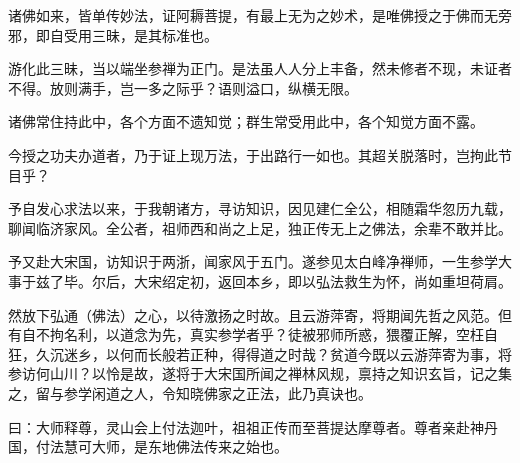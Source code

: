 




诸佛如来，皆单传妙法，证阿耨菩提，有最上无为之妙术，是唯佛授之于佛而无旁邪，即自受用三昧，是其标准也。

游化此三昧，当以端坐参禅为正门。是法虽人人分上丰备，然未修者不现，未证者不得。放则满手，岂一多之际乎？语则溢口，纵横无限。

诸佛常住持此中，各个方面不遗知觉；群生常受用此中，各个知觉方面不露。

今授之功夫办道者，乃于证上现万法，于出路行一如也。其超关脱落时，岂拘此节目乎？

予自发心求法以来，于我朝诸方，寻访知识，因见建仁全公，相随霜华忽历九载，聊闻临济家风。全公者，祖师西和尚之上足，独正传无上之佛法，余辈不敢并比。

予又赴大宋国，访知识于两浙，闻家风于五门。遂参见太白峰净禅师，一生参学大事于兹了毕。尔后，大宋绍定初，返回本乡，即以弘法救生为怀，尚如重坦荷肩。

然放下弘通（佛法）之心，以待激扬之时故。且云游萍寄，将期闻先哲之风范。但有自不拘名利，以道念为先，真实参学者乎？徒被邪师所惑，猥覆正解，空枉自狂，久沉迷乡，以何而长般若正种，得得道之时哉？贫道今既以云游萍寄为事，将参访何山川？以怜是故，遂将于大宋国所闻之禅林风规，禀持之知识玄旨，记之集之，留与参学闲道之人，令知晓佛家之正法，此乃真诀也。

曰：大师释尊，灵山会上付法迦叶，祖祖正传而至菩提达摩尊者。尊者亲赴神丹国，付法慧可大师，是东地佛法传来之始也。

